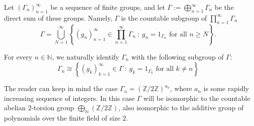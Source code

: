 \documentclass[oneside,english]{amsart}
\newtheorem{lem}[thm]{Lemma}
\theoremstyle{definition}
\begin{document}

Let $(\Gamma_n)_{n=1}^\infty$ be a sequence of finite groups, and let $\Gamma := \bigoplus_{n=1}^\infty \Gamma_n$ be the direct sum of these groups.
Namely, $\Gamma$ is the countable subgroup of $\prod_{n=1}^\infty \Gamma_n$
\begin{equation}
\Gamma =\bigcup_{N=1}^\infty\left\{ (g_n)_{n=1}^\infty\in  \prod_{n=1}^\infty \Gamma_n ~:~ g_n=1_{\Gamma_n} \mbox{ for all } n \ge N\right\}.
\end{equation}


For every $n \in \mathbb{N}$, we naturally identify $\Gamma_n$ with the following subgroup of $\Gamma$:
$$\Gamma_n \cong \left\{ (g_k)_{k=1}^\infty  \in \Gamma ~:~ g_k = 1_{\Gamma_k} \mbox{ for all } k \ne n \right\}$$

The reader can keep in mind the case $\Gamma_n = (\mathbb{Z}/2\mathbb{Z})^{a_n}$, where $a_n$ is some rapidly increasing sequence of integers.
In this case $\Gamma$ will be isomorphic to the countable abelian $2$-torsion group $\bigoplus_{\mathbb{N}}(\mathbb{Z}/2\mathbb{Z})$, also isomorphic to the additive group of polynomials over the finite field of size $2$.
\end{document}
